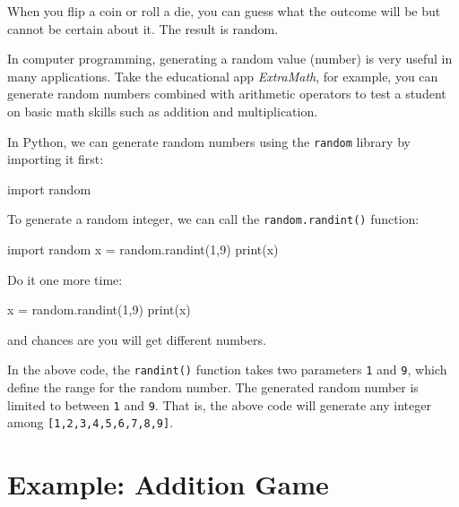 \documentclass[
  letterpaper,
]{scrbook}
\newenvironment{Shaded}{\begin{snugshade}}{\end{snugshade}}
\newcommand{\BuiltInTok}[1]{\textcolor[rgb]{0.00,0.23,0.31}{#1}}
\newcommand{\DecValTok}[1]{\textcolor[rgb]{0.68,0.00,0.00}{#1}}
\newcommand{\ImportTok}[1]{\textcolor[rgb]{0.00,0.46,0.62}{#1}}
\newcommand{\NormalTok}[1]{\textcolor[rgb]{0.00,0.23,0.31}{#1}}
\newcommand{\OperatorTok}[1]{\textcolor[rgb]{0.37,0.37,0.37}{#1}}
\begin{document}
When you flip a coin or roll a die, you can guess what the outcome will
be but cannot be certain about it. The result is random.

In computer programming, generating a random value (number) is very
useful in many applications. Take the educational app \emph{ExtraMath},
for example, you can generate random numbers combined with arithmetic
operators to test a student on basic math skills such as addition and
multiplication.

In Python, we can generate random numbers using the \texttt{random}
library by importing it first:

\begin{Shaded}
\begin{Highlighting}[]
\ImportTok{import}\NormalTok{ random}
\end{Highlighting}
\end{Shaded}

To generate a random integer, we can call the \texttt{random.randint()}
function:

\begin{Shaded}
\begin{Highlighting}[]
\ImportTok{import}\NormalTok{ random}
\NormalTok{x }\OperatorTok{=}\NormalTok{ random.randint(}\DecValTok{1}\NormalTok{,}\DecValTok{9}\NormalTok{)}
\BuiltInTok{print}\NormalTok{(x)}
\end{Highlighting}
\end{Shaded}

Do it one more time:

\begin{Shaded}
\begin{Highlighting}[]
\NormalTok{x }\OperatorTok{=}\NormalTok{ random.randint(}\DecValTok{1}\NormalTok{,}\DecValTok{9}\NormalTok{)}
\BuiltInTok{print}\NormalTok{(x)}
\end{Highlighting}
\end{Shaded}

and chances are you will get different numbers.

In the above code, the \texttt{randint()} function takes two parameters
\texttt{1} and \texttt{9}, which define the range for the random number.
The generated random number is limited to between \texttt{1} and
\texttt{9}. That is, the above code will generate any integer among
\texttt{{[}1,2,3,4,5,6,7,8,9{]}}.

\section*{Example: Addition Game}\label{example-addition-game}
\end{document}
